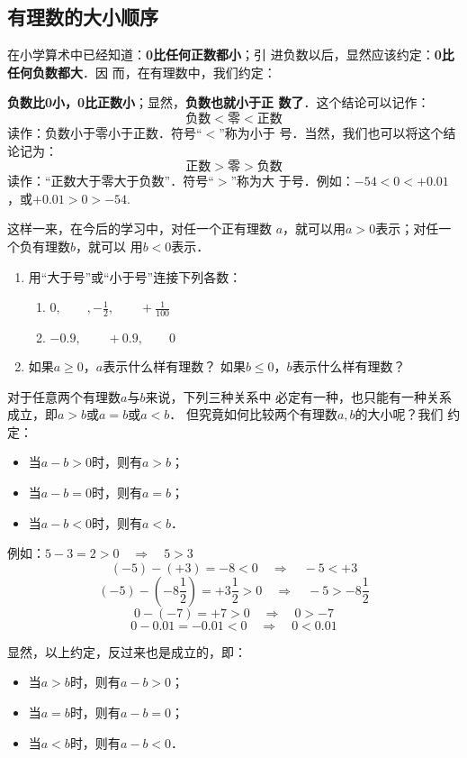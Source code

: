 \subsection{有理数的大小顺序}
在小学算术中已经知道：\textbf{0比任何正数都小}；引
进负数以后，显然应该约定：\textbf{0比任何负数都大}．因
而，在有理数中，我们约定：

\textbf{负数比0小，0比正数小}；显然，\textbf{负数也就小于正
	数了}．这个结论可以记作：
\[\text{负数}<\text{零}<\text{正数}\]
读作：负数小于零小于正数．符号“$<$”称为小于
号．当然，我们也可以将这个结论记为：
\[\text{正数}>\text{零}>\text{负数}\]
读作：“正数大于零大于负数”．符号“$>$”称为大
于号．例如：$-54<0<+0.01$，或$+0.01>0> -54$.

这样一来，在今后的学习中，对任一个正有理数
$a$，就可以用$a>0$表示；对任一个负有理数$b$，就可以
用$b<0$表示．

\begin{ex}
	\begin{enumerate}
		\item 用“大于号”或“小于号”连接下列各数：
		\begin{enumerate}
			\item $0,\qquad ,-\frac{1}{2},\qquad +\frac{1}{100}$
			\item $-0.9,\qquad +0.9,\qquad 0$
		\end{enumerate}
		\item 如果$a\ge 0$，$a$表示什么样有理数？
		如果$b\le 0$，$b$表示什么样有理数？
	\end{enumerate}
\end{ex}   

对于任意两个有理数$a$与$b$来说，下列三种关系中
必定有一种，也只能有一种关系成立，即$a>b$或$a =b$或$a<b$．
但究竟如何比较两个有理数$a,  b$的大小呢？我们
约定：
\begin{itemize}
	\item 当$a-b>0$时，则有$a > b$；
	\item     当$a-b=0$时，则有$a=b$；
	\item   当$a-b<0$时，则有$a < b$．
\end{itemize}

例如：$5-3=2>0 \quad \Rightarrow\quad 5>3$
\[(-5)-(+3)=-8<0 \quad \Rightarrow\quad -5<+3\]
\[(-5)-\left(-8\frac{1}{2}\right)=+3\frac{1}{2}>0 \quad \Rightarrow\quad -5>-8\frac{1}{2}\]
\[0-(-7)=+7>0 \quad \Rightarrow\quad 0>-7\]
\[0-0.01=-0.01<0 \quad \Rightarrow\quad 0<0.01\]

显然，以上约定，反过来也是成立的，即：
\begin{itemize}
	\item 当$a>b$时，则有$a-b>0$；
	\item     当$a =b$时，则有$a-b=0$；
	\item     当$a<b$时，则有$a-b<0$．
\end{itemize}

